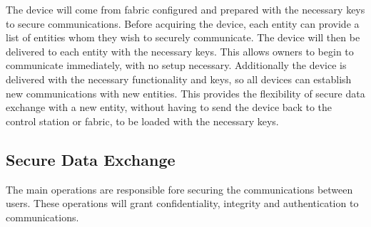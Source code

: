 The device will come from fabric configured and prepared with the necessary keys to secure communications.
Before acquiring the device, each entity can provide a list of entities whom they wish to securely communicate. The device will then be delivered to each entity with the necessary keys. This allows owners to begin to communicate immediately, with no setup necessary.
Additionally the device is delivered with the necessary functionality and keys, so all devices can establish new communications with new entities. This provides the flexibility of secure data exchange with a new entity, without having to send the device back to the control station or fabric, to be loaded with the necessary keys.

\subsection{Secure Data Exchange}\label{chap:arch:services:data}

The main operations are responsible fore securing the communications between users. These operations will grant confidentiality, integrity and authentication to communications.


